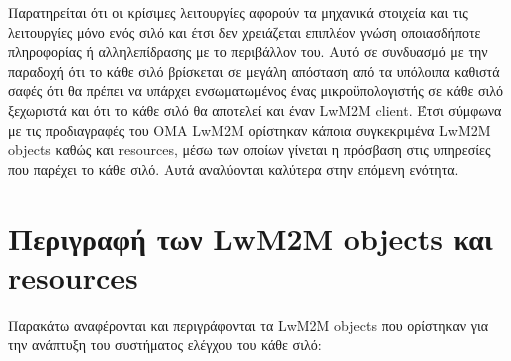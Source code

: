 	Παρατηρείται ότι οι κρίσιμες λειτουργίες αφορούν τα μηχανικά στοιχεία και τις λειτουργίες μόνο ενός σιλό και έτσι δεν χρειάζεται επιπλέον γνώση οποιασδήποτε πληροφορίας ή αλληλεπίδρασης με το περιβάλλον του. Αυτό σε συνδυασμό με την παραδοχή ότι το κάθε σιλό βρίσκεται σε μεγάλη απόσταση από τα υπόλοιπα καθιστά σαφές ότι θα πρέπει να υπάρχει ενσωματωμένος ένας μικροϋπολογιστής σε κάθε σιλό ξεχωριστά και ότι το κάθε σιλό θα αποτελεί και έναν LwM2M client. Έτσι σύμφωνα με τις προδιαγραφές του OMA LwM2M ορίστηκαν κάποια συγκεκριμένα LwM2M objects καθώς και resources, μέσω των οποίων γίνεται η πρόσβαση στις υπηρεσίες που παρέχει το κάθε σιλό. Αυτά αναλύονται καλύτερα στην επόμενη ενότητα.
	
\section{Περιγραφή των LwM2M objects και resources}
Παρακάτω αναφέρονται και περιγράφονται τα LwM2M objects που ορίστηκαν για την ανάπτυξη του συστήματος ελέγχου του κάθε σιλό: 

